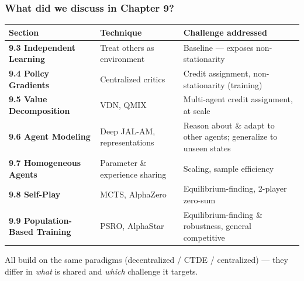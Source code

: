 \begin{frame}
\frametitle{What did we discuss in Chapter 9?}

\small

\centering
\begin{tabularx}{\textwidth}{
>{\bfseries}l
>{\raggedright\arraybackslash}l
>{\raggedright\arraybackslash}X
}
\toprule
Section & Technique & Challenge addressed \\
\midrule

9.3 Independent Learning
&
Treat others as environment
&
Baseline --- exposes non-stationarity
\\

9.4 Policy Gradients
&
Centralized critics
&
Credit assignment, non-stationarity (training)
\\

9.5 Value Decomposition
&
VDN, QMIX
&
Multi-agent credit assignment, at scale
\\

9.6 Agent Modeling
&
Deep JAL-AM, representations
&
Reason about \& adapt to other agents; generalize to unseen states
\\

9.7 Homogeneous Agents
&
Parameter \& experience sharing
&
Scaling, sample efficiency
\\

9.8 Self-Play
&
MCTS, AlphaZero
&
Equilibrium-finding, 2-player zero-sum
\\

9.9 Population-Based Training
&
PSRO, AlphaStar
&
Equilibrium-finding \& robustness, general competitive
\\

\bottomrule
\end{tabularx}

\vspace{0.6em}
{\footnotesize All build on the same paradigms (decentralized / CTDE /
centralized) --- they differ in \emph{what} is shared and \emph{which}
challenge it targets.}

\end{frame}

